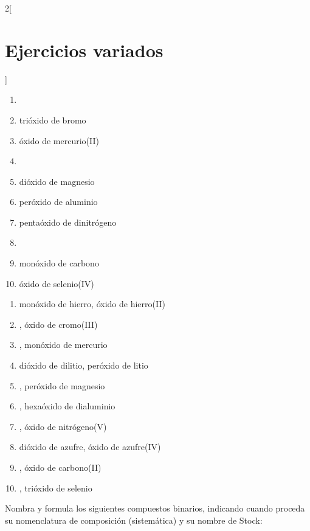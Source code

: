 \documentclass[10pt]{article}
\begin{document}
\begin{multicols*}{2}[
  \section{Ejercicios variados}
  ]
\begin{exercise}[
    tags    = {inorgánica,compuestos binarios,óxidos,peróxidos},
    topics  = {química inorgánica,formulación,nomenclatura},
    source  = {SAN Formulación, p27, e31},
  ]
  \begin{enumerate}
    \item {}
    \item trióxido de bromo
    \item óxido de mercurio(II)
    \item {}
    \item dióxido de magnesio
    \item peróxido de aluminio
    \item pentaóxido de dinitrógeno
    \item {}
    \item monóxido de carbono
    \item óxido de selenio(IV)
  \end{enumerate}
\end{exercise}

\begin{solution}
  \begin{enumerate}
    \item monóxido de hierro, óxido de hierro(II)
    \item {}, óxido de cromo(III)
    \item {}, monóxido de mercurio
    \item dióxido de dilitio, peróxido de litio
    \item {}, peróxido de magnesio
    \item {}, hexaóxido de dialuminio
    \item {}, óxido de nitrógeno(V)
    \item dióxido de azufre, óxido de azufre(IV)
    \item {}, óxido de carbono(II)
    \item {}, trióxido de selenio
  \end{enumerate}
\end{solution}




\begin{exercise}[
    tags    = {inorgánica,compuestos binarios,óxidos,peróxidos},
    topics  = {química inorgánica,formulación,nomenclatura},
    source  = {SAN Formulación, p27, e32},
  ]
  Nombra y formula los siguientes compuestos binarios, indicando cuando proceda su nomenclatura de composición (sistemática) y su nombre de Stock:


\end{exercise}
\end{multicols*}
\end{document}
